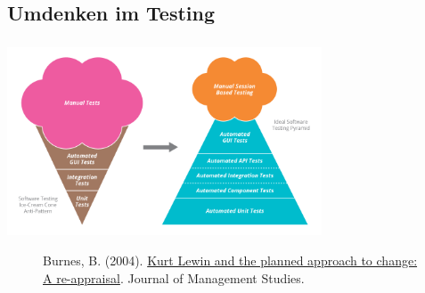 \documentclass[aspectratio=169]{beamer}
\begin{document}
\subsection{Umdenken im Testing}
\begin{frame}
\frametitle{\subsecname}\framesubtitle{\secname}
\centering
\includegraphics[width=0.7\textwidth]{pictures/TestPyramid.png}
\vfill
\begin{figure}[!b]
  Burnes, B. (2004). \href{http://doi.org/10.1111/j.1467-6486.2004.00463.x}{Kurt Lewin and the planned approach to change: A re-appraisal}. Journal of Management Studies.
\end{figure}
\end{frame}
\end{document}
